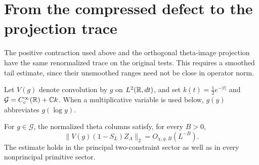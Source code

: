 \section{From the compressed defect to the projection trace}
\label{sec:trace-transfer}
The positive contraction used above and the orthogonal theta-image
projection have the same renormalized trace on the original tests.
This requires a smoothed tail estimate, since their unsmoothed ranges
need not be close in operator norm.

Let $V(g)$ denote convolution by $g$ on $L^2(\mathbb R,dt)$, and set
$k(t)=\tfrac12e^{-|t|}$ and
$\mathcal G=C_c^\infty(\mathbb R)+\mathbb C k$. When a multiplicative variable
is used below, $g(y)$ abbreviates $g(\log y)$.

\begin{lemma}\label{lem:smoothed-tail}
For $g\in\mathcal G$, the normalized theta columns satisfy, for every
$B>0$,
\[
 \|V(g)(1-S_L)Z_\Lambda\|_2=O_{\chi,g,B}(L^{-B}).
\]
The estimate holds in the principal two-constraint sector as well
as in every nonprincipal primitive sector.
\end{lemma}
